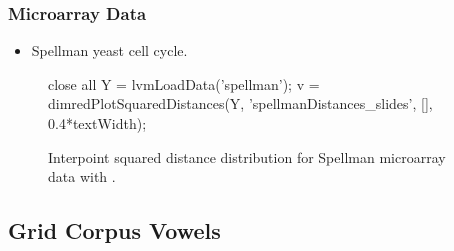\begin{frame}[fragile]
  \frametitle{Microarray Data}
  \begin{itemize}
  \item Spellman yeast cell cycle.
  \end{itemize}
  \begin{figure}
    \begin{matlab}
    close all
    Y = lvmLoadData('spellman');
    v = dimredPlotSquaredDistances(Y, 'spellmanDistances_slides', [], 0.4*textWidth);
    \end{matlab}

    \begin{center}
    \end{center}
    
    
    \caption{Interpoint squared distance distribution for Spellman
      microarray data with \captionInfo.}
    
  \end{figure}


\end{frame}

\subsection{Grid Corpus Vowels}

